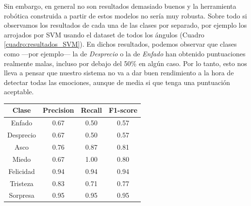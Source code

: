 Sin embargo, en general no son resultados demasiado buenos y la herramienta robótica construida a partir de estos modelos no sería muy robusta. Sobre todo si observamos los resultados de cada una de las clases por separado, por ejemplo los arrojados por SVM usando el dataset de todos los ángulos (Cuadro \ref{cuadro:resultados_SVM}). En dichos resultados, podemos observar que clases como ---por ejemplo--- la de \textit{Desprecio} o la de \textit{Enfado} han obtenido puntuaciones realmente malas, incluso por debajo del 50\% en algún caso. Por lo tanto, esto nos lleva a pensar que nuestro sistema no va a dar buen rendimiento a la hora de detectar todas las emociones, aunque de media si que tenga una puntuación aceptable.\\

\begin{table}
\begin{minipage}{0.48\linewidth}
\centering
\begin{adjustbox}{max width=\textwidth}
\begin{tabular}{|c|c|c|c|}
\hline
\textbf{Clase} & \textbf{Precision} & \textbf{Recall} & \textbf{F1-score}\\
\hline
     Enfado & 0.67 & 0.50 & 0.57\\
     Desprecio & 0.67 & 0.50 & 0.57\\
     Asco & 0.76 & 0.87 & 0.81\\
     Miedo & 0.67 & 1.00 & 0.80\\
     Felicidad & 0.94 & 0.94 & 0.94\\
     Tristeza & 0.83 & 0.71 & 0.77\\
     Sorpresa & 0.95 & 0.95 & 0.95\\
\hline
\end{tabular}
\end{adjustbox}
\vspace{0.5cm}


\end{minipage}
\end{table}
